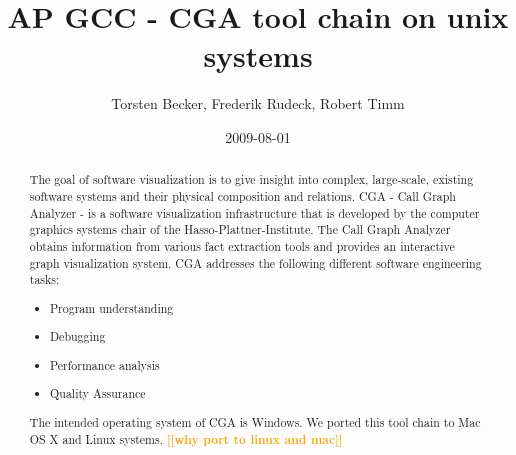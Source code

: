 \documentclass[a4paper]{article}
\title{AP GCC - CGA tool chain on unix systems}
\author{ Torsten Becker, Frederik Rudeck, Robert Timm }
\date{2009-08-01}
\newcommand{\todo}[1]{\textsf{\textbf{\textcolor{Orange}{[[#1]]}}}}
\begin{document}
\lstset{language=C++}

\ifpdf {} \else {} \fi

\maketitle
\begin{abstract}
The goal of software visualization is to give insight into complex, large-scale, existing software systems and their physical composition and relations. CGA - Call Graph Analyzer - is a software visualization infrastructure that is developed by the computer graphics systems chair of the Hasso-Plattner-Institute. The Call Graph Analyzer obtains information from various fact extraction tools and provides an interactive graph visualization system. CGA addresses the following different software engineering tasks:

\begin{itemize}
	\item Program understanding
	\item Debugging
	\item Performance analysis
	\item Quality Assurance
\end{itemize}

The intended operating system of CGA is Windows. We ported this tool chain to Mac OS X and Linux systems. \todo{why port to linux and mac}
\end{abstract}

\newpage

\tableofcontents
\newpage


\setlength{\parskip}{0.27cm}


 

\newpage

 

\newpage

 

\newpage

 

\newpage

 

\newpage

 

\newpage

 

\newpage

 

 

\end{document}
